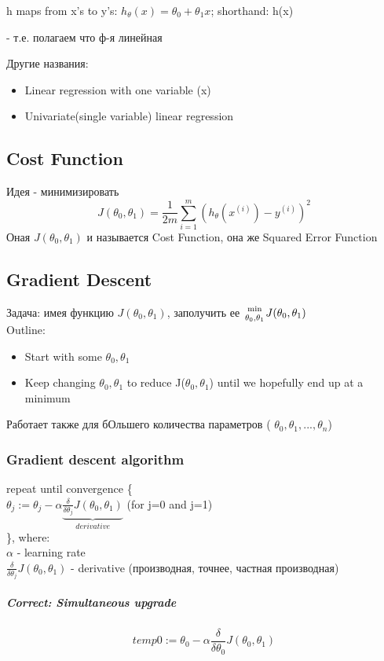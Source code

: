 \documentclass{scrartcl}
\begin{document}
h maps from x's to y's: $h_\theta(x)=\theta_0 + \theta_1x$; shorthand: h(x) 

- т.е. полагаем что ф-я линейная 

Другие названия:
\begin{itemize}
\item Linear regression with one variable (x)
\item Univariate(single variable) linear regression
\end{itemize}
\subsection {Cost Function}
\label{2-2}
Идея - минимизировать \[ J(\theta_0, \theta_1) = \frac{1}{2m}
\sum_{i=1}^m\left( h_\theta (x^{(i)}) - y^{(i)} \right)^2
\]
Оная $J(\theta_0, \theta_1)$ и называется Cost Function, она же
Squared Error Function

\subsection {Gradient Descent}
\label {2-5}
Задача: имея функцию $J(\theta_0, \theta_1)$, заполучить ее
${\min \atop \theta_0, \theta_1} J(\theta_0, \theta_1)$ \\
Outline:
\begin {itemize}
\item Start with some $\theta_0, \theta_1$
\item Keep changing $\theta_0, \theta_1$ to reduce J($\theta_0,
  \theta_1$) until we hopefully end up at a minimum
\end{itemize}
Работает также для бОльшего количества параметров ( $\theta_0,
\theta_1,..., \theta_n$)
\subsubsection {Gradient descent algorithm}
repeat until convergence \{ \\
$\theta_j := \theta_j - {\alpha} \underbrace{ \frac {\delta}{\delta
    \theta_j} J(\theta_0,
  \theta_1)}_{derivative}$ (for j=0 and j=1) \\
\}, where: \\
$\alpha$ - learning rate \\
$\frac {\delta}{\delta \theta_j} J(\theta_0, \theta_1)$ - derivative
(производная, точнее, частная производная)

\subparagraph {Correct: Simultaneous upgrade}

\[temp0 := \theta_0 - \alpha \frac {\delta}{\delta \theta_0}
J(\theta_0, \theta_1)\]
\end{document}
